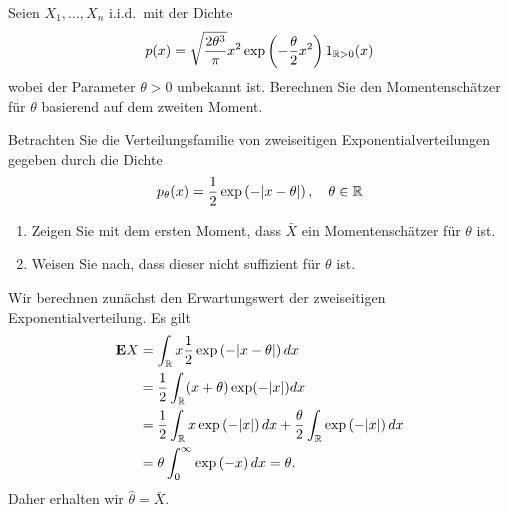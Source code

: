 
 Seien 
$X_1,\ldots,X_n$ i.i.d.\ mit der Dichte 
\begin{equation*}
	p(x) = \sqrt{ \frac{2 \theta^3}{\pi} } x^2 \exp\left( - \frac{\theta}{2}x^2 \right) 1_{\mathbb R>0}(x)
\end{equation*}
wobei der Parameter $\theta>0$ unbekannt ist. Berechnen Sie den Momentenschätzer für $\theta$
basierend auf dem zweiten Moment. 

   Betrachten 
Sie die Verteilungsfamilie von zweiseitigen Exponentialverteilungen
gegeben durch die Dichte
\begin{equation*}
	p_\theta(x) = \frac{1}{2} \exp\left( -| x- \theta | \right), \quad \theta\in\mathbb R
\end{equation*}
\begin{enumerate}
    \item Zeigen Sie mit dem ersten Moment, dass $\bar X$ ein Momentenschätzer
        für $\theta$ ist.
    \item Weisen Sie nach, dass dieser nicht suffizient für $\theta$ ist.
\end{enumerate}

\solution Wir berechnen zunächst den Erwartungswert der zweiseitigen
Exponentialverteilung. Es gilt
\begin{align*}
    \mathbf{E} X &= \int_{\mathbb R}^{} x \frac{1}{2} \exp \left( -| x-\theta| \right) dx \\
    &= \frac{1}{2} \int_{\mathbb R}^{} (x+\theta) \exp ( -|x|) dx \\
    &= \frac{1}{2} \int_{\mathbb R} x \exp \left( -|x| \right) dx + 
        \frac{\theta}{2} \int_{\mathbb R} \exp \left( -|x| \right) dx \\
        &= \theta \int_{0}^{\infty} \exp \left( -x \right) dx = \theta.
\end{align*}
Daher erhalten wir $\hat \theta = \bar X$. 

